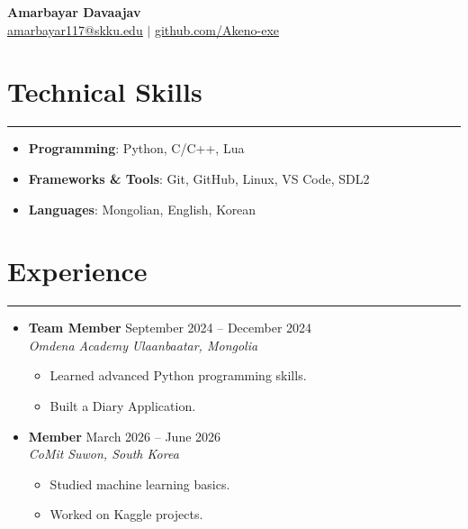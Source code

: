 \documentclass[letterpaper, 10pt]{article}
\begin{document}
\begin{center}
    \textbf{\LARGE Amarbayar Davaajav} \\ \vspace{2pt}
    \href{mailto:amarbayar117@skku.edu}{\underline{amarbayar117@skku.edu}} $|$
    \href{https://github.com/Akeno-exe}{\underline{github.com/Akeno-exe}}
\end{center}
\section*{Technical Skills}
\hrule
\vspace{4pt}
\begin{itemize}
    \item[] \textbf{Programming}: Python, C/C++, Lua%
    \item[] \textbf{Frameworks \& Tools}: Git, GitHub, Linux, VS Code, SDL2%
    \item[] \textbf{Languages}: Mongolian, English, Korean %
\end{itemize}
\section*{Experience}
\hrule
\vspace{4pt}
\begin{itemize}
    \item[]
        \textbf{Team Member} \hfill September 2024 -- December 2024 \\ %
        \textit{Omdena Academy} \hfill \textit{Ulaanbaatar, Mongolia}
        \begin{itemize}
            \item Learned advanced Python programming skills.
            \item Built a Diary Application.
        \end{itemize}
    \item[]
        \textbf{Member} \hfill March 2026 -- June 2026 \\ %
        \textit{CoMit} \hfill \textit{Suwon, South Korea}
        \begin{itemize}
            \item Studied machine learning basics.
            \item Worked on Kaggle projects.
        \end{itemize}
\end{itemize}
\end{document}
